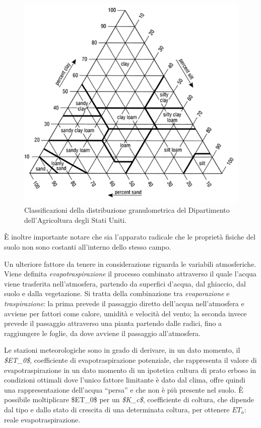 \documentclass[12pt,a4paper,openright,twoside, openany]{book}
\begin{document}
\begin{figure}[ht]
    \centering\includegraphics[width=0.52\linewidth]{../figures/soil-texture.png}\caption{Classificazioni della distribuzione granulometrica del Dipartimento dell'Agricoltura degli Stati Uniti\cite{RAI2017505}.}\label{fig.soil-texture}
\end{figure}
\newpage

È inoltre importante notare che sia l'apparato radicale che le proprietà fisiche del suolo non sono costanti all'interno dello stesso campo.

Un ulteriore fattore da tenere in considerazione riguarda le variabili atmosferiche. Viene definita \textit{evapotraspirazione} il processo combinato attraverso il quale l'acqua viene trasferita nell'atmosfera, partendo da superfici d'acqua, dal ghiaccio, dal suolo e dalla vegetazione\cite{Kirkham2014}. Si tratta della combinazione tra \textit{evaporazione} e \textit{traspirazione}: la prima prevede il passaggio diretto dell'acqua nell'atmosfera e avviene per fattori come calore, umidità e velocità del vento; la seconda invece prevede il passaggio attraverso una pianta partendo dalle radici, fino a raggiungere le foglie, da dove avviene il passaggio all'atmosfera.

Le stazioni meteorologiche\cite{Allen1998CropE} sono in grado di derivare, in un dato momento, il \textit{\ac{$ET_0$}}, coefficiente di evapotraspirazione potenziale, che rappresenta il valore di evapotraspirazione in un dato momento di un ipotetica cultura di prato erboso in condizioni ottimali dove l'unico fattore limitante è dato dal clima, offre quindi una rappresentazione dell'acqua ``persa'' e che non è più presente nel suolo. È possibile moltiplicare \ac{$ET_0$} per un \textit{\ac{$K_c$}}, coefficiente di coltura, che dipende dal tipo e dallo stato di crescita di una determinata coltura, per ottenere $ET_a$: reale evapotraspirazione.
\end{document}
